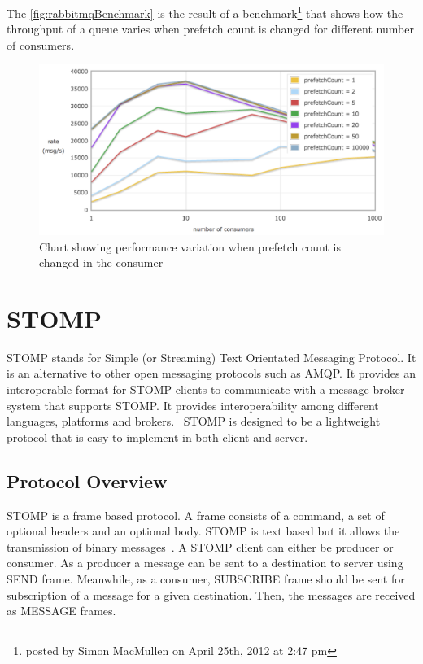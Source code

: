   The \autoref{fig:rabbitmqBenchmark} is the result of a benchmark\footnote{posted by Simon MacMullen on April 25th, 2012 at 2:47 pm} that shows how the throughput of a queue varies when prefetch count is changed for different number of consumers.
\begin{figure}[H]
  \centering
  \includegraphics[width=1\textwidth]{figures/rabbitmqPrefetch}
  \caption[Chart showing performance variation when prefetch count is changed in the consumer]{Chart showing performance variation when prefetch count is changed in the consumer\footnotemark}
  \label{fig:rabbitmqBenchmark}
\end{figure}

\section{STOMP}
\label{sec:stomp}
  STOMP stands for Simple (or Streaming) Text Orientated Messaging Protocol. It is an alternative to other open messaging protocols such as AMQP. It provides an interoperable format for STOMP clients to communicate with a message broker system that supports STOMP. It provides interoperability among different languages, platforms and brokers.~\cite{stomp}
  STOMP is designed to be a lightweight protocol that is easy to implement in both client and server.
  \subsection{Protocol Overview}
  STOMP is a frame based protocol. A frame consists of a command, a set of optional headers and an optional body. STOMP is text based but it allows the transmission of binary messages~\cite{stomp}.
  A STOMP client can either be producer or consumer. As a producer  a message can be sent to a destination to server using SEND frame. Meanwhile, as a consumer, SUBSCRIBE frame should be sent for subscription of a message for a given destination. Then, the messages are received as MESSAGE frames.

